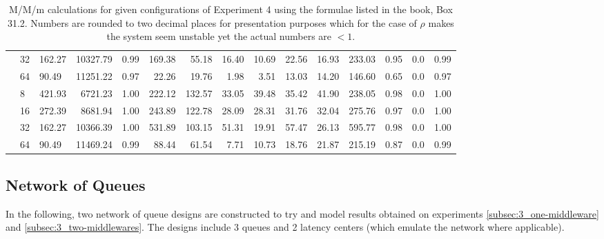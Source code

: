 \begin{table}
\begin{adjustwidth}{-1cm}{}
{\begin{tabular}{lllrrrrrrrrrrrr}
                                 & 32 & 162.27 & 10327.79  & 0.99   & 169.38 & 55.18  & 16.40 & 10.69 & 22.56 & 16.93 & 233.03          & 0.95      & 0.0   & 0.99 \\
                                 & 64 & 90.49  & 11251.22  & 0.97   & 22.26  & 19.76  & 1.98  & 3.51  & 13.03 & 14.20 & 146.60          & 0.65      & 0.0   & 0.97 \\
                        \addlinespace
                        288      & 8  & 421.93 & 6721.23   & 1.00   & 222.12 & 132.57 & 33.05 & 39.48 & 35.42 & 41.90 & 238.05          & 0.98      & 0.0   & 1.00 \\
                                 & 16 & 272.39 & 8681.94   & 1.00   & 243.89 & 122.78 & 28.09 & 28.31 & 31.76 & 32.04 & 275.76          & 0.97      & 0.0   & 1.00 \\
                                 & 32 & 162.27 & 10366.39  & 1.00   & 531.89 & 103.15 & 51.31 & 19.91 & 57.47 & 26.13 & 595.77          & 0.98      & 0.0   & 1.00 \\
                                 & 64 & 90.49  & 11469.24  & 0.99   & 88.44  & 61.54  & 7.71  & 10.73 & 18.76 & 21.87 & 215.19          & 0.87      & 0.0   & 0.99 \\
                        \bottomrule
                    \end{tabular}
                    \caption{M/M/m calculations for given configurations of Experiment 4 using the formulae listed in
                             the book, Box 31.2. Numbers are rounded to two decimal places for presentation purposes
                             which for the case of $\rho$ makes the system seem unstable yet the actual numbers are
                             $< 1$.\label{tab:mmm}}
                }
            \end{adjustwidth}
        \end{table}

        \subsection{Network of Queues\label{subsec:7_noc}}

            In the following, two network of queue designs are constructed to try and model results obtained on
            experiments \ref{subsec:3_one-middleware} and \ref{subsec:3_two-middlewares}. The designs include 3 queues
            and 2 latency centers (which emulate the network where applicable).


